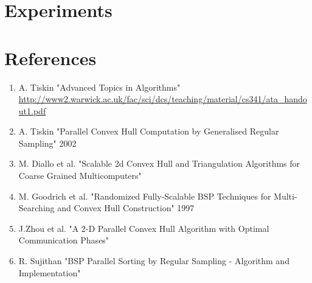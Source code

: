 \documentclass[a4paper]{article}
\begin{document}
\begin{figure}[htb!]
        \hfill
    \end{figure}

\section {Experiments}




\section {References}
    \begin {enumerate}
        \item A. Tiskin "Advanced Topics in Algorithms" \url{http://www2.warwick.ac.uk/fac/sci/dcs/teaching/material/cs341/ata_handout1.pdf}
        \item A. Tiskin "Parallel Convex Hull Computation by Generalised Regular Sampling" 2002
        \item M. Diallo et al. "Scalable 2d Convex Hull and Triangulation Algorithms for Coarse Grained Multicomputers"
        \item M. Goodrich et al. "Randomized Fully-Scalable BSP Techniques for Multi-Searching and Convex Hull Construction" 1997
        \item J.Zhou et al. "A 2-D Parallel Convex Hull Algorithm with Optimal Communication Phases"
        \item R. Sujithan "BSP Parallel Sorting by Regular Sampling - Algorithm and Implementation"
    \end {enumerate}
\end{document}
